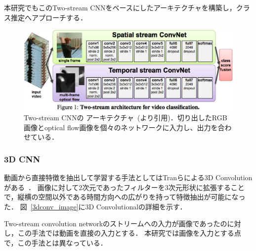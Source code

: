 本研究でもこのTwo-stream CNNをベースにしたアーキテクチャを構築し，クラス推定へアプローチする．
\begin{figure}[htbp]
 \begin{center}
  \includegraphics[width=12cm]{./Figures/two-stream.eps}
  \caption{Two-stream CNNの アーキテクチャ~(\cite{simonyan2014two}より引用)．切り出したRGB画像とoptical flow画像を個々のネットワークに入力し、出力を合わせている．}
  \label{2st_network}
 \end{center}
\end{figure}

\subsubsection{3D CNN}
動画から直接特徴を抽出して学習する手法としてはTranらによる3D Convolution がある~\cite{tran14}．
画像に対して2次元であったフィルターを3次元形状に拡張することで，縦横の空間以外である時間方向への広がりを持って特徴抽出が可能になった．
図~\ref{3dconv_image}に3D Convolutionalの詳細を示す．

Two-stream convolution networkのストリームへの入力が画像であったのに対し，この手法では動画を直接の入力とする．
本研究では画像を入力とする点で，この手法とは異なっている．

